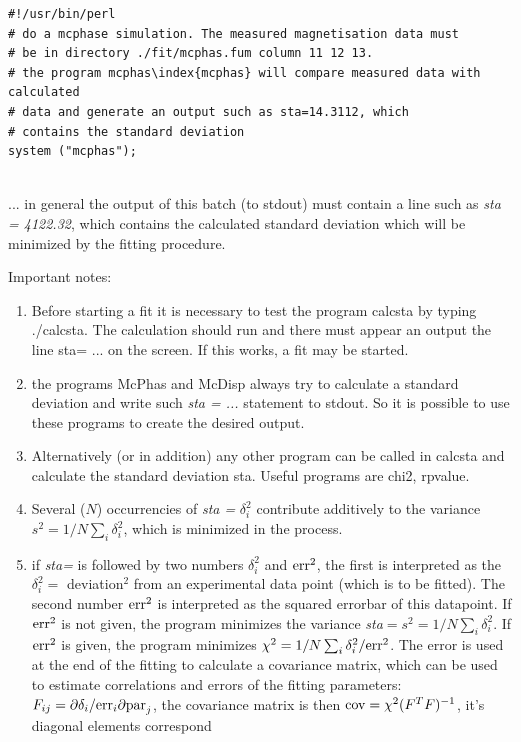 \begin{verbatim}
#!/usr/bin/perl
# do a mcphase simulation. The measured magnetisation data must
# be in directory ./fit/mcphas.fum column 11 12 13.
# the program mcphas\index{mcphas} will compare measured data with calculated
# data and generate an output such as sta=14.3112, which
# contains the standard deviation
system ("mcphas");


\end{verbatim}

... in general the output of this batch (to stdout) must contain a line
such as {\em sta = 4122.32}, which contains the calculated standard
deviation which will be minimized by the fitting procedure.

Important notes:
\begin{enumerate}
\item
Before starting a fit it is necessary to test the program {\prg calcsta} by typing
{\prg ./calcsta}. The calculation should run and there must appear an output
the line {\prg sta= ...} on the screen. If this works, a fit may be started.
\item the programs {\prg McPhas} and {\prg McDisp} always try to
calculate a standard deviation and write such {\em sta = ...} statement
to stdout.  So it is possible to use these programs to create the desired output.
\item
 Alternatively (or in addition)
any other program can be called in {\prg calcsta} and calculate the 
standard deviation {\prg sta}. Useful  programs are {\prg chi2},
{\prg rpvalue}.
\item Several ($N$) occurrencies of {\em sta = } $\delta_i^2$  contribute additively to
the variance $s^2=1/N\sum_i \delta_i^2$, which is minimized in the process.
\item
if {\em sta=} is followed by two numbers $\delta_i^2$ and ${\rm err}^2$, the first is interpreted as the 
 $\delta_i^2=$ deviation$^2$ from an experimental data point (which is to be fitted).
The second number ${\rm err}^2$  is interpreted as the squared errorbar of this 
datapoint. If ${\rm err}^2$ is not given, the program minimizes the variance
{\em sta}$=s^2=1/N\sum_i \delta_i^2$.
If ${\rm err}^2$ is given, the program minimizes $\chi^2=1/N\sum_i \delta_i^2/{\rm err}^2$.
The error is used at the end of the fitting to calculate
a covariance matrix, which can be used to estimate correlations
and errors of the fitting parameters: $F_{ij}=\partial \delta_i / {\rm err}_i\partial {\rm par}_j$,
the covariance matrix is then ${\rm cov}=\chi^2(F^TF)^{-1}$, it's diagonal elements correspond

\end{enumerate}
